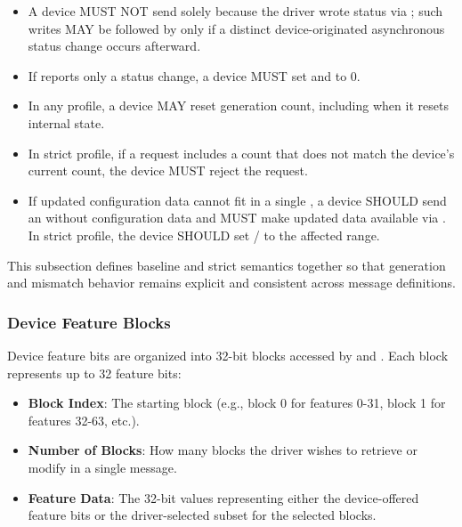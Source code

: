 \begin{itemize}
        driver.
  \item A device MUST NOT send  solely because the driver
        wrote status via ; such writes MAY be
        followed by  only if a distinct
        device-originated asynchronous status change occurs afterward.
  \item If  reports only a status change, a device MUST
        set  and  to 0.
  \item In any profile, a device MAY reset generation count, including when it
        resets internal state.
  \item In strict profile, if a  request includes a
         count that does not match the device's current
        count, the device MUST reject the request.
  \item If updated configuration data cannot fit in a single
        , a device SHOULD send an 
        without configuration data and MUST make updated data available via
        . In strict profile, the device SHOULD set
        / to the affected range.
\end{itemize}

This subsection defines baseline and strict semantics together so that
generation and mismatch behavior remains explicit and consistent across message
definitions.

\subsubsection{Device Feature Blocks}
\label{sec:Virtio Transport Options / Virtio Over Messages / Basic Concepts / Device Feature Blocks}

Device feature bits are organized into 32-bit blocks accessed by
 and . Each block
represents up to 32 feature bits:

\begin{itemize}
  \item \textbf{Block Index}: The starting block (e.g., block 0 for
        features 0-31, block 1 for features 32-63, etc.).
  \item \textbf{Number of Blocks}: How many blocks the driver wishes to retrieve
        or modify in a single message.
  \item \textbf{Feature Data}: The 32-bit values representing either the
        device-offered feature bits or the driver-selected subset for the
        selected blocks.
\end{itemize}

